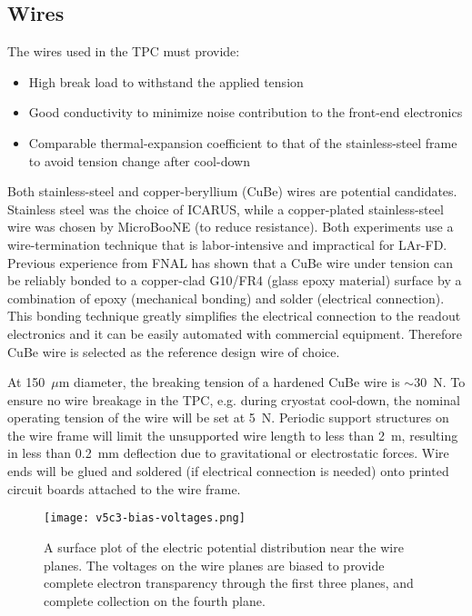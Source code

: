 \subsection{Wires}

The wires used in the TPC must provide:
\begin{itemize}
\item High break load to withstand the applied tension 
\item Good conductivity to minimize noise contribution to the front-end electronics
\item Comparable thermal-expansion coefficient to that of the stainless-steel 
frame to avoid tension change after cool-down
\end{itemize}

Both stainless-steel and copper-beryllium (CuBe) wires are potential candidates.  
Stainless steel was the choice of ICARUS, while a copper-plated 
stainless-steel wire was chosen by MicroBooNE  (to reduce resistance).  Both experiments use a wire-termination 
technique that is labor-intensive and impractical for LAr-FD. Previous experience from FNAL \cite{FNAL-proto-APA} has shown that a CuBe wire under 
tension can be reliably bonded to a copper-clad G10/FR4 (glass epoxy material) surface by a combination of  epoxy (mechanical bonding) 
and solder (electrical connection).  This bonding technique greatly simplifies the electrical 
connection to the readout electronics and it can be easily automated 
with commercial equipment.  Therefore CuBe wire is 
selected as the reference design wire of choice.

At 150~$\mu$m diameter,  the breaking tension of a hardened CuBe wire is $\sim$30~N.  
To ensure no wire breakage in the TPC, e.g. during cryostat cool-down, the nominal operating tension of the wire will be set at 5~N.  Periodic support structures on the wire frame will
limit the unsupported wire length to less than 2~m, resulting in less than 0.2~mm deflection due to gravitational or electrostatic forces.  Wire ends will be glued and soldered (if electrical connection is needed) 
onto printed circuit boards attached to the wire frame.

\begin{figure}[htbp]
\centering
\texttt{[image: v5c3-bias-voltages.png]}
\caption[Plot of electric potential distribution near the wire planes]{A surface plot of the electric potential distribution near the wire planes.  The voltages on the wire planes are biased to provide complete electron transparency through the first three planes, and complete collection on the fourth plane. }
\label{fig:tpc-bias-voltages}
\end{figure}

